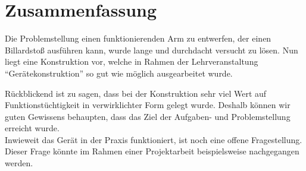 \chapter{Zusammenfassung}
	Die Problemstellung einen funktionierenden Arm zu entwerfen, der einen Billardstoß ausführen kann, wurde lange und durchdacht versucht zu lösen.
	Nun liegt eine Konstruktion vor, welche in Rahmen der Lehrveranstaltung "`Gerätekonstruktion"' so gut wie möglich ausgearbeitet wurde.\par \medskip
	Rückblickend ist zu sagen, dass bei der Konstruktion sehr viel Wert auf Funktionstüchtigkeit in verwirklichter Form gelegt wurde.
	Deshalb können wir guten Gewissens behaupten, dass das Ziel der Aufgaben- und Problemstellung erreicht wurde.\\
	Inwieweit das Gerät in der Praxis funktioniert, ist noch eine offene Fragestellung.
	Dieser Frage könnte im Rahmen einer Projektarbeit beispielsweise nachgegangen werden.